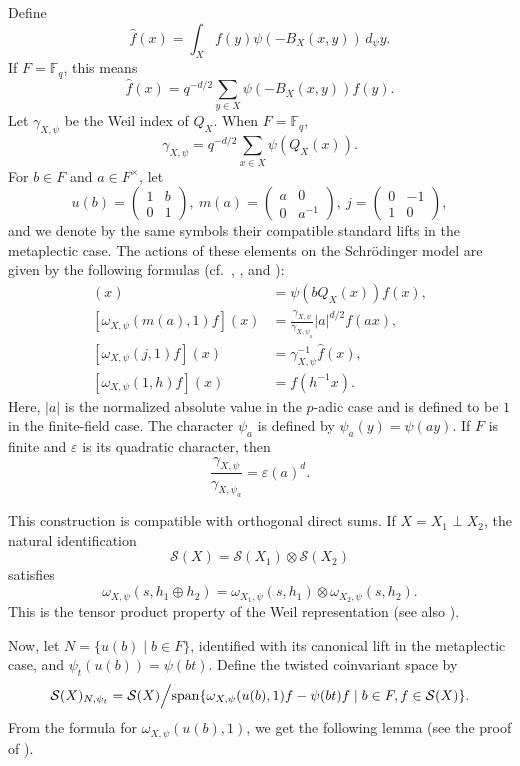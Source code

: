 \documentclass[12pt]{amsart}
\theoremstyle{definition}
\theoremstyle{remark}
\begin{document}
Define
\[
\widehat f(x)=\int_X f(y)\psi(-B_X(x,y))\,d_\psi y.
\]
If $F=\mathbb F_q$, this means
\[
\widehat f(x)
=q^{-d/2}\sum_{y\in X}\psi(-B_X(x,y))f(y).
\]
Let $\gamma_{X,\psi}$ be the Weil index of $Q_X$. When $F=\mathbb F_q$, 
\[
\gamma_{X,\psi}
=q^{-d/2}\sum_{x\in X}\psi(Q_X(x)).
\]
For
$b\in F$ and $a\in F^\times$,
let
\[
u(b)=\begin{pmatrix}1&b\\0&1\end{pmatrix},~
m(a)=\begin{pmatrix}a&0\\0&a^{-1}\end{pmatrix},~
j=\begin{pmatrix}0&-1\\1&0\end{pmatrix},
\]
and we denote by the same symbols their compatible standard lifts in the metaplectic case. The actions of these elements on the Schr\"odinger model are given by the following formulas (cf.~\cite[pp.~64--65]{ger77},
\cite[\S 1.1 and \S 4]{pra98}, and
\cite[\S II.4]{kud96}):
\begin{align*}
[\omega_{X,\psi}(u(b),1)f](x)
&=\psi(bQ_X(x))f(x),\\
[\omega_{X,\psi}(m(a),1)f](x)
&=\frac{\gamma_{X,\psi}}{\gamma_{X,\psi_a}}
  |a|^{d/2}f(ax),\\
[\omega_{X,\psi}(j,1)f](x)
&=\gamma_{X,\psi}^{-1}\widehat f(x),\\
[\omega_{X,\psi}(1,h)f](x)
&=f(h^{-1}x).
\end{align*}
Here, $|a|$ is the normalized absolute value in the
$p$-adic case and is defined to be $1$ in the
finite-field case. The character $\psi_a$ is defined by $\psi_a(y)=\psi(ay)$.
If $F$ is finite and $\varepsilon$ is its
quadratic character, then
\[
\frac{\gamma_{X,\psi}}{\gamma_{X,\psi_a}}
=\varepsilon(a)^d.
\]

This construction is compatible with orthogonal direct sums.
If $X=X_1\perp X_2$, the natural identification
\[
\mathcal S(X)=\mathcal S(X_1)\otimes\mathcal S(X_2)
\]
satisfies
\[
\omega_{X,\psi}(s,h_1\oplus h_2)
=
\omega_{X_1,\psi}(s,h_1)\otimes
\omega_{X_2,\psi}(s,h_2).
\]
This is the tensor product property of the Weil representation
\cite[\S 1, Remark 1]{pra98} (see also \cite[Corollary 2.5]{ger77}).

Now, let $N=\{u(b) \mid b\in F\}$, identified with its canonical lift
in the metaplectic case, and $\psi_t(u(b))=\psi(bt)$. Define the twisted coinvariant space by
\[
\mathcal S(X)_{N,\psi_t}
=
\mathcal S(X)\Big/
{\rm span}\{
\omega_{X,\psi}(u(b),1)f-\psi(bt)f \mid 
b\in F, f \in \mathcal S(X)\}.
\]
From the formula for $\omega_{X,\psi}(u(b),1)$, we get the following lemma (see the proof of \cite[ Proposition 6.1]{gw21}).
\end{document}
